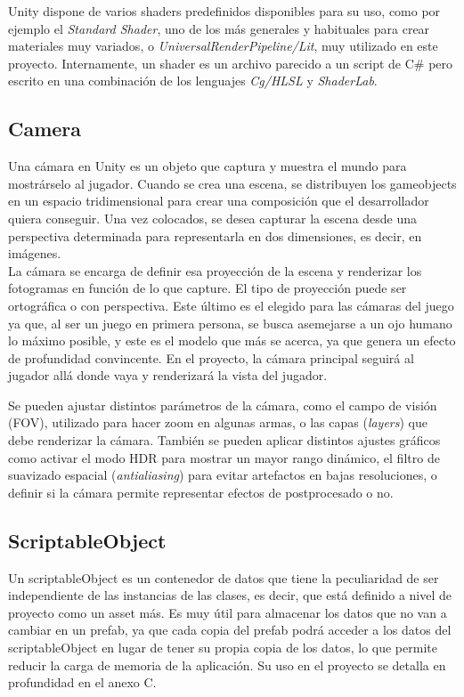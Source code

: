 Unity dispone de varios shaders predefinidos disponibles para su uso, como por ejemplo el \textit{Standard Shader}, uno de los más generales y habituales para crear materiales muy variados, o \textit{UniversalRenderPipeline/Lit}, muy utilizado en este proyecto.
Internamente, un shader es un archivo parecido a un script de C\# pero escrito en una combinación de los lenguajes \textit{Cg/HLSL} y \textit{ShaderLab}.
\subsection{Camera}
Una cámara en Unity \cite{doc:Camera} es un objeto que captura y muestra el mundo para mostrárselo al jugador. Cuando se crea una escena, se distribuyen los gameobjects en un espacio tridimensional para crear una composición que el desarrollador quiera conseguir. Una vez colocados, se desea capturar la escena desde una perspectiva determinada para representarla en dos dimensiones, es decir, en imágenes.\\
La cámara se encarga de definir esa proyección de la escena y renderizar los fotogramas en función de lo que capture. El tipo de proyección puede ser ortográfica o con perspectiva. Este último es el elegido para las cámaras del juego ya que, al ser un juego en primera persona, se busca asemejarse a un ojo humano lo máximo posible, y este es el modelo que más se acerca, ya que genera un efecto de profundidad convincente. En el proyecto, la cámara principal seguirá al jugador allá donde vaya y renderizará la vista del jugador.

Se pueden ajustar distintos parámetros de la cámara, como el campo de visión (FOV), utilizado para hacer zoom en algunas armas, o las capas (\textit{layers}) que debe renderizar la cámara. También se pueden aplicar distintos ajustes gráficos como activar el modo HDR para mostrar un mayor rango dinámico, el filtro de suavizado espacial (\textit{antialiasing}) para evitar artefactos en bajas resoluciones, o definir si la cámara permite representar efectos de postprocesado o no.
\subsection{ScriptableObject}
Un scriptableObject \cite{doc:ScriptableObject} es un contenedor de datos que tiene la peculiaridad de ser independiente de las instancias de las clases, es decir, que está definido a nivel de proyecto como un asset más. Es muy útil para almacenar los datos que no van a cambiar en un prefab, ya que cada copia del prefab podrá acceder a los datos del scriptableObject en lugar de tener su propia copia de los datos, lo que permite reducir la carga de memoria de la aplicación.
Su uso en el proyecto se detalla en profundidad en el anexo C.
